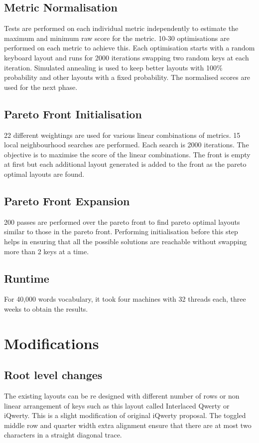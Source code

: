 \documentclass[MTech]{iitmdiss}
\begin{document}
\section{Metric Normalisation}
Tests are performed on each individual metric independently to estimate the maximum and minimum raw score for the metric.
10-30 optimisations are performed on each metric to achieve this.
Each optimisation starts with a random keyboard layout and runs for 2000 iterations swapping two random keys at each iteration.
Simulated annealing is used to keep better layouts with 100\% probability and other layouts with a fixed probability.
The normalised scores are used for the next phase.

\section{Pareto Front Initialisation}
22 different weightings are used for various linear combinations of metrics.
15 local neighbourhood searches are performed. Each search is 2000 iterations.
The objective is to maximise the score of the linear combinations.
The front is empty at first but each additional layout generated is added to the front as the pareto optimal layouts are found.


\section{Pareto Front Expansion}
200 passes are performed over the pareto front to find pareto optimal layouts similar to those in the pareto front.
Performing initialisation before this step helps in ensuring that all the possible solutions are reachable without swapping more than 2 keys at a time.

\section{Runtime}
For 40,000 words vocabulary, it took four machines with 32 threads each, three weeks to obtain the results.

\chapter{Modifications}
\section{Root level changes}
The existing layouts can be re designed with different number of rows or non linear arrangement of keys such as this layout called Interlaced Qwerty or iQwerty. This is a slight modification of original iQwerty proposal. The toggled middle row and quarter width extra alignment ensure that there are at most two characters in a straight diagonal trace. 
\end{document}
